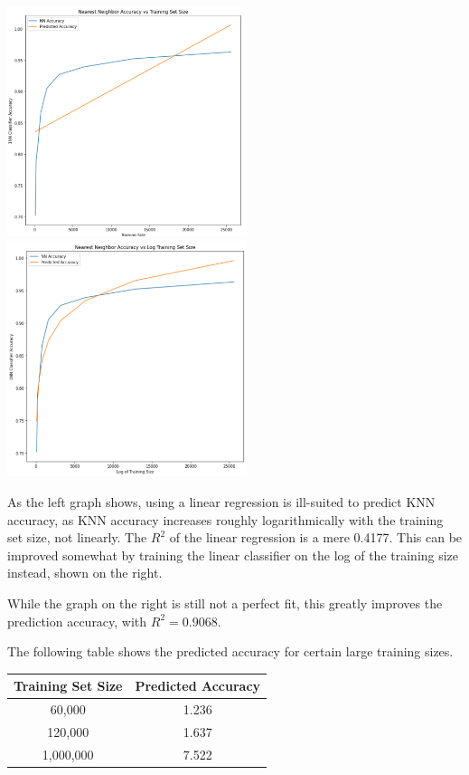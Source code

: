 \documentclass{article}
\begin{document}
\begin{enumerate}[start=1]
    \begin{center}
    \includegraphics[width=7cm]{4.1.png}
    \includegraphics[width=7cm]{4.2.png}
    \end{center}
    
    As the left graph shows, using a linear regression is ill-suited to predict KNN accuracy, as KNN accuracy increases roughly logarithmically with the training set size, not linearly. The $R^2$ of the linear regression is a mere 0.4177. This can be improved somewhat by training the linear classifier on the log of the training size instead, shown on the right.
    
    While the graph on the right is still not a perfect fit, this greatly improves the prediction accuracy, with $R^2 = 0.9068$.
    
    The following table shows the predicted accuracy for certain large training sizes.
    
    \begin{tabular}{| c | c |}
    \hline
    \textbf{Training Set Size} & \textbf{Predicted Accuracy} \\
    \hline
    60,000 & 1.236 \\
    \hline
    120,000 & 1.637 \\
    \hline
    1,000,000 & 7.522 \\
    \hline
    \end{tabular}
    

\end{enumerate}
\end{document}
